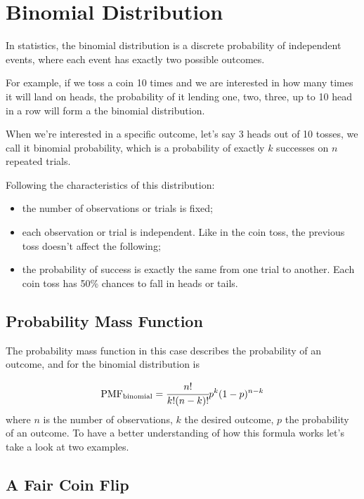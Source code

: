 \chapter{Binomial Distribution}\label{binomial-distribution}

In statistics, the binomial distribution is a discrete probability of independent events, where each event has exactly two possible outcomes.

For example, if we toss a coin 10 times and we are interested in how many times it will land on heads, the probability of it lending one, two, three, up to 10 head in a row will form a the binomial distribution. 

When we're interested in a specific outcome, let's say 3 heads out of 10 tosses, we call it binomial probability, which is a probability of exactly \(k\) successes on \(n\) repeated trials.

Following the characteristics of this distribution:

\begin{itemize}
\tightlist
\item
  the number of observations or trials is fixed;
\item
  each observation or trial is independent. Like in the coin toss, the previous toss doesn't affect the following;
\item
  the probability of success is exactly the same from one trial to another. Each coin toss has 50\% chances to fall in heads or tails.
\end{itemize}

\section{Probability Mass Function}
\label{probability-mass-function}

The probability mass function in this case describes the probability of an outcome, and for the binomial distribution is

\begin{equation} \mathrm{PMF}_{\mathrm{binomial}} = \cfrac{n!}{k!(n-k)!}p^k (1-p)^{n-k}
\label{eq:binomial_pmf}
\end{equation}
where \(n\) is the number of observations, \(k\) the desired outcome, \(p\) the probability of an outcome. To have a better understanding of how this formula works let's take a look at two examples.

\section{A Fair Coin Flip}\label{a-fair-coin-flip}


